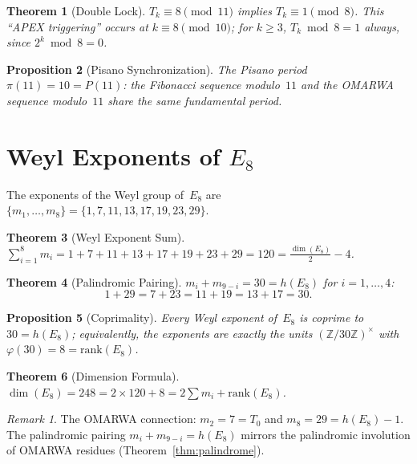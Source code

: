 \documentclass[11pt, a4paper]{article}
\theoremstyle{plain}
\newtheorem{theorem}{Theorem}[section]
\newtheorem{proposition}[theorem]{Proposition}
\theoremstyle{definition}
\theoremstyle{remark}
\newtheorem{remark}{Remark}[section]
\begin{document}
\begin{theorem}[Double Lock]\label{thm:double-lock}
$T_k \equiv 8 \pmod{11}$ implies $T_k \equiv 1 \pmod{8}$.
This ``APEX triggering'' occurs at $k \equiv 8 \pmod{10}$; for
$k \geq 3$, $T_k \bmod 8 = 1$ always, since $2^k \bmod 8 = 0$.
\end{theorem}

\begin{proposition}[Pisano Synchronization]\label{prop:pisano}
The Pisano period $\pi(11) = 10 = P(11)$: the Fibonacci sequence
modulo~$11$ and the OMARWA sequence modulo~$11$ share the same
fundamental period.
\end{proposition}

\section{Weyl Exponents of
  \texorpdfstring{$E_8$}{E8}}\label{sec:weyl}

The exponents of the Weyl group of~$E_8$ are
$\{m_1, \ldots, m_8\} = \{1, 7, 11, 13, 17, 19, 23, 29\}$.

\begin{theorem}[Weyl Exponent Sum]\label{thm:weyl-sum}
$\displaystyle\sum_{i=1}^{8} m_i = 1 + 7 + 11 + 13 + 17 + 19 + 23 + 29
= 120 = \frac{\dim(E_8)}{2} - 4$.
\end{theorem}

\begin{theorem}[Palindromic Pairing]\label{thm:weyl-palindrome}
$m_i + m_{9-i} = 30 = h(E_8)$ for $i = 1, \ldots, 4$:
\[
  1 + 29 = 7 + 23 = 11 + 19 = 13 + 17 = 30.
\]
\end{theorem}

\begin{proposition}[Coprimality]\label{prop:weyl-coprime}
Every Weyl exponent of~$E_8$ is coprime to $30 = h(E_8)$; equivalently,
the exponents are exactly the units $(\mathbb{Z}/30\mathbb{Z})^{\times}$
with $\varphi(30) = 8 = \mathrm{rank}(E_8)$.
\end{proposition}

\begin{theorem}[Dimension Formula]\label{thm:dim-e8}
$\dim(E_8) = 248 = 2 \times 120 + 8 = 2\sum m_i + \mathrm{rank}(E_8)$.
\end{theorem}

\begin{remark}
The OMARWA connection: $m_2 = 7 = T_0$ and $m_8 = 29 = h(E_8) - 1$.
The palindromic pairing $m_i + m_{9-i} = h(E_8)$ mirrors the
palindromic involution of OMARWA residues
(Theorem~\ref{thm:palindrome}).
\end{remark}
\end{document}
